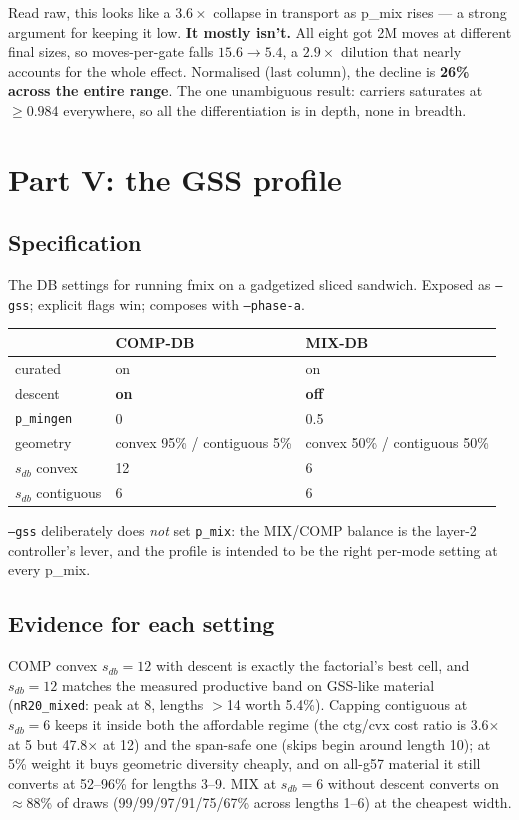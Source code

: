\documentclass[11pt]{article}
\newcommand{\code}[1]{\texttt{#1}}
\begin{document}
Read raw, this looks like a $3.6\times$ collapse in transport as p\_mix rises ---
a strong argument for keeping it low. \textbf{It mostly isn't.} All eight got
2M moves at different final sizes, so moves-per-gate falls $15.6\rightarrow5.4$,
a $2.9\times$ dilution that nearly accounts for the whole effect. Normalised
(last column), the decline is \textbf{26\% across the entire range}. The one
unambiguous result: carriers saturates at $\ge0.984$ everywhere, so all the
differentiation is in depth, none in breadth.

\section{Part V: the GSS profile}

\subsection{Specification}

The DB settings for running fmix on a gadgetized sliced sandwich. Exposed as
\code{--gss}; explicit flags win; composes with \code{--phase-a}.

\begin{center}\small
\begin{tabular}{lll}
\toprule
 & COMP-DB & MIX-DB \\
\midrule
curated & on & on \\
descent & \textbf{on} & \textbf{off} \\
\code{p\_mingen} & 0 & 0.5 \\
geometry & convex 95\% / contiguous 5\% & convex 50\% / contiguous 50\% \\
$s_{db}$ convex & 12 & 6 \\
$s_{db}$ contiguous & 6 & 6 \\
\bottomrule
\end{tabular}
\end{center}

\code{--gss} deliberately does \emph{not} set \code{p\_mix}: the MIX/COMP
balance is the layer-2 controller's lever, and the profile is intended to be
the right per-mode setting at every p\_mix.

\subsection{Evidence for each setting}

COMP convex $s_{db}=12$ with descent is exactly the factorial's best cell, and
$s_{db}=12$ matches the measured productive band on GSS-like material
(\code{nR20\_mixed}: peak at 8, lengths $>$14 worth 5.4\%). Capping contiguous
at $s_{db}=6$ keeps it inside both the affordable regime (the ctg/cvx cost
ratio is 3.6$\times$ at 5 but 47.8$\times$ at 12) and the span-safe one (skips
begin around length 10); at 5\% weight it buys geometric diversity cheaply, and
on all-g57 material it still converts at 52--96\% for lengths 3--9. MIX at
$s_{db}=6$ without descent converts on $\approx$88\% of draws (99/99/97/91/75/67\%
across lengths 1--6) at the cheapest width.
\end{document}
